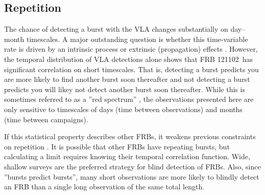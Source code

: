 \documentclass[twocolumn]{aastex61}
\newcommand{\frb}{FRB 121102}
\begin{document}

\subsection{Repetition}

The chance of detecting a burst with the VLA changes substantially on day--month timescales. A major outstanding question is whether this time-variable rate is driven by an intrinsic process \citep{2016ApJ...826..226K} or extrinsic (propagation) effects \citep{CORDES}. However, the temporal distribution of VLA detections alone shows that \frb\ has significant correlation on short timescales. That is, detecting a burst predicts you are more likely to find another burst soon thereafter and not detecting a burst predicts you will likey not detect another burst soon thereafter. While this is sometimes referred to as a ''red spectrum'' \citep{2016MNRAS.458L..89C}, the observations presented here are only sensitive to timescales of days (time between observations) and months (time between campaigns). 

If this statistical property describes other FRBs, it weakens previous constraints on repetition \citep{2015MNRAS.454..457P,2015ApJ...807...16L}. It is possible that other FRBs have repeating bursts, but calculating a limit requires knowing their temporal correlation function. Wide, shallow surveys are the preferred strategy for blind detection of FRBs. Also, since ''bursts predict bursts'', many short observations are more likely to blindly detect an FRB than a single long observation of the same total length. 
\end{document}
